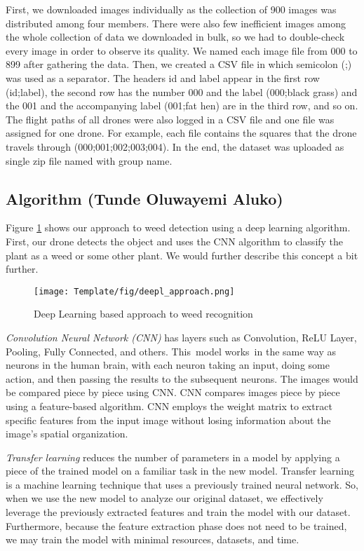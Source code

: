 \documentclass[english]{lni}
\begin{document}
First, we downloaded images individually as the collection of 900 images was distributed among four members. There were also few inefficient images among the whole collection of data we downloaded in bulk, so we had to double-check every image in order to observe its quality. We named each image file from 000 to 899 after gathering the data. Then, we created a CSV file in which semicolon (;) was used as a separator. The headers id and label appear in the first row (id;label), the second row has the number 000 and the label (000;black grass) and the 001 and the accompanying label (001;fat hen) are in the third row, and so on. The flight paths of all drones were also logged in a CSV file and one file was assigned for one drone. For example, each file contains the squares that the drone travels through (000;001;002;003;004). In the end, the dataset was uploaded as single zip file named with group name.


\subsection{Algorithm (Tunde Oluwayemi Aluko)}
Figure \ref{fig:deepLalg} shows our approach to weed detection using a deep learning algorithm. First, our drone detects the object and uses the CNN algorithm to classify the plant as a weed or some other plant. We would further describe this concept a bit further. 
\begin{figure}[htp]
    \centering
    \texttt{[image: Template/fig/deepl\_approach.png]}
    \caption{Deep Learning based approach to weed recognition\cite{kounalakis2019deep}}
    \label{fig:deepLalg}
\end{figure}

\emph{Convolution Neural Network (CNN)} has layers such as Convolution, ReLU Layer, Pooling, Fully Connected, and others. This model works in the same way as neurons in the human brain, with each neuron taking an input, doing some action, and then passing the results to the subsequent neurons. The images would be compared piece by piece using CNN. 
CNN compares images piece by piece using a feature-based algorithm. CNN employs the weight matrix to extract specific features from the input image without losing information about the image's spatial organization.

\emph{Transfer learning} reduces the number of parameters in a model by applying a piece of the trained model on a familiar task in the new model. Transfer learning is a machine learning technique that uses a previously trained neural network. So, when we use the new model to analyze our original dataset, we effectively leverage the previously extracted features and train the model with our dataset. Furthermore, because the feature extraction phase does not need to be trained, we may train the model with minimal resources, datasets, and time\cite{hasan2019deep}.
\end{document}
